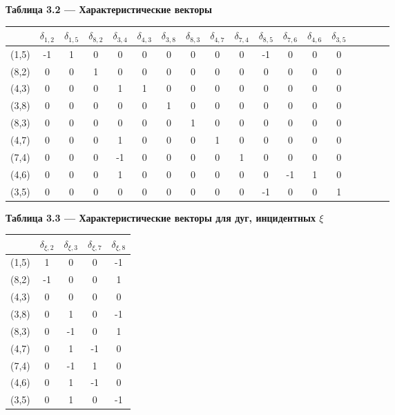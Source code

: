 \documentclass[14pt]{extarticle}%
\begin{document}
\begin{center}
\textbf{Таблица 3.2 --- Характеристические векторы }\\
\begin{tabular}{c|ccccccccccccccccc}
 &$\delta _{1,2}$ & $\delta _{1,5}$ & $\delta _{8,2}$ & $\delta _{3,4}$ & $\delta _{4,3}$ & $\delta _{3,8}$ & $\delta _{8,3}$ & $\delta _{4,7}$ & $\delta _{7,4}$ & $\delta _{8,5}$ & $\delta _{7,6}$ & $\delta _{4,6}$ & $\delta _{3,5}$\\\hline
 (1,5)& -1 & 1 & 0 & 0 & 0 & 0 & 0 & 0 & 0 & -1 & 0 & 0 & 0 \\
 (8,2)&0 & 0 & 1 & 0 & 0 & 0 & 0 & 0 & 0 & 0 & 0 & 0 & 0  \\
 (4,3)&0 & 0 & 0 & 1 & 1 & 0 & 0 & 0 & 0 & 0 & 0 & 0 & 0  \\
 (3,8)&0 & 0 & 0 & 0 & 0 & 1 & 0 & 0 & 0 & 0 & 0 & 0 & 0  \\
 (8,3)&0 & 0 & 0 & 0 & 0 & 0 & 1 & 0 & 0 & 0 & 0 & 0 & 0  \\
 (4,7)&0 & 0 & 0 & 1 & 0 & 0 & 0 & 1 & 0 & 0 & 0 & 0 & 0  \\
 (7,4)&0 & 0 & 0 & -1 & 0 & 0 & 0 & 0 & 1 & 0 & 0 & 0 & 0 \\
 (4,6)&0 & 0 & 0 & 1 & 0 & 0 & 0 & 0 & 0 & 0 & -1 & 1 & 0 \\
 (3,5)&0 & 0 & 0 & 0 & 0 & 0 & 0 & 0 & 0 & -1 & 0 & 0 & 1 \\
\end{tabular}
\end{center}
\begin{center}
\textbf{Таблица 3.3 --- Характеристические векторы для дуг, инцидентных $\xi$}\\
\begin{tabular}{c|cccc}
 &$\delta _{\xi, 2}$ & $\delta _{\xi, 3}$ & $\delta _{\xi, 7}$ & $\delta _{\xi, 8}$ \\\hline
 (1,5)&1 & 0 & 0 & -1 \\
 (8,2)&-1 & 0 & 0 & 1 \\
 (4,3)&0 & 0 & 0 & 0 \\
(3,8)& 0 & 1 & 0 & -1 \\
 (8,3)&0 & -1 & 0 & 1 \\
 (4,7)&0 & 1 & -1 & 0 \\
(7,4)&0 & -1 & 1 & 0 \\
(4,6)& 0 & 1 & -1 & 0 \\
(3,5)& 0 & 1 & 0 & -1 \\
\end{tabular}
\end{center}
\end{document}
